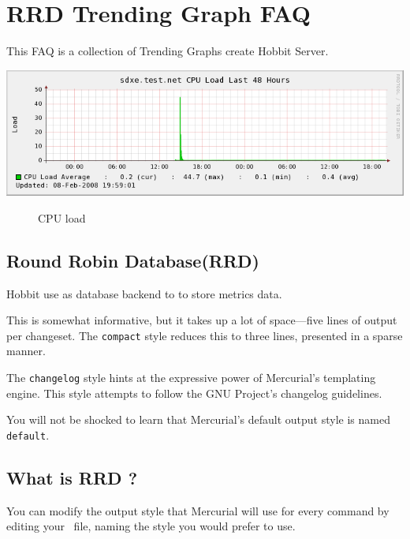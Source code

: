 \chapter{RRD Trending Graph FAQ}
\label{chap:hobbitgraph}


This FAQ is a collection of Trending Graphs create Hobbit Server.

\includegraphics[scale=0.6]{./hobbitgraph.png} 


\begin{figure}[htb]
  \centering
  \caption{CPU load }
  \label{fig:cpu:load}
\end{figure}


\section{Round Robin Database(RRD) }
\label{sec:style}

Hobbit use  as database backend to to store metrics data.



This is somewhat informative, but it takes up a lot of space---five
lines of output per changeset.  The \texttt{compact} style reduces
this to three lines, presented in a sparse manner.


The \texttt{changelog} style hints at the expressive power of
Mercurial's templating engine.  This style attempts to follow the GNU
Project's changelog guidelines\cite{web:changelog}.


You will not be shocked to learn that Mercurial's default output style
is named \texttt{default}.

\section{What is RRD ?}

You can modify the output style that Mercurial will use for every
command by editing your \hgrc\ file, naming the style you would
prefer to use.

